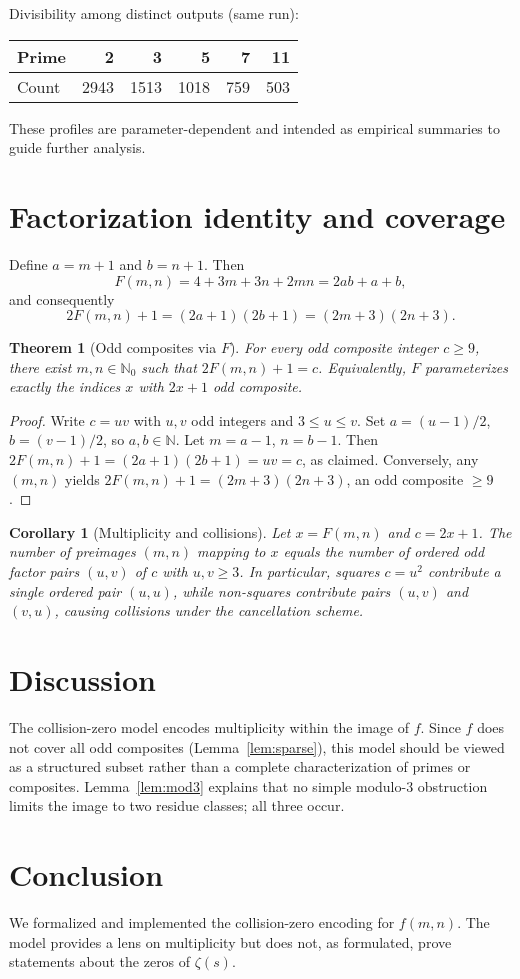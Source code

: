 \documentclass[12pt,a4paper]{article}
\newtheorem{theorem}{Theorem}[section]
\newtheorem{corollary}{Corollary}[section]
\begin{document}
Divisibility among distinct outputs (same run):
\begin{center}
\begin{tabular}{l|rrrrr}
Prime & 2 & 3 & 5 & 7 & 11 \\
\hline
Count & 2943 & 1513 & 1018 & 759 & 503 \\
\end{tabular}
\end{center}

These profiles are parameter-dependent and intended as empirical summaries to guide further analysis.

\section{Factorization identity and coverage}
Define \(a=m+1\) and \(b=n+1\). Then
\[
F(m,n) = 4 + 3m + 3n + 2mn = 2ab + a + b,
\]
and consequently
\[
2F(m,n) + 1 = (2a+1)(2b+1) = (2m+3)(2n+3).
\]

\begin{theorem}[Odd composites via \(F\)]\label{thm:coverage}
For every odd composite integer \(c\ge 9\), there exist \(m,n\in\mathbb{N}_0\) such that \(2F(m,n) + 1 = c\). Equivalently, \(F\) parameterizes exactly the indices \(x\) with \(2x+1\) odd composite.
\end{theorem}
\begin{proof}
Write \(c=uv\) with \(u,v\) odd integers and \(3\le u\le v\). Set \(a=(u-1)/2\), \(b=(v-1)/2\), so \(a,b\in\mathbb{N}\). Let \(m=a-1\), \(n=b-1\). Then
\(2F(m,n) + 1 = (2a+1)(2b+1) = uv = c\), as claimed. Conversely, any \((m,n)\) yields \(2F(m,n)+1=(2m+3)(2n+3)\), an odd composite \(\ge 9\).
\end{proof}

\begin{corollary}[Multiplicity and collisions]\label{cor:mult}
Let \(x=F(m,n)\) and \(c=2x+1\). The number of preimages \((m,n)\) mapping to \(x\) equals the number of ordered odd factor pairs \((u,v)\) of \(c\) with \(u,v\ge 3\). In particular, squares \(c=u^2\) contribute a single ordered pair \((u,u)\), while non-squares contribute pairs \((u,v)\) and \((v,u)\), causing collisions under the cancellation scheme.
\end{corollary}

\section{Discussion}
The collision-zero model encodes multiplicity within the image of \(f\). Since \(f\) does not cover all odd composites (Lemma~\ref{lem:sparse}), this model should be viewed as a structured subset rather than a complete characterization of primes or composites. Lemma~\ref{lem:mod3} explains that no simple modulo-3 obstruction limits the image to two residue classes; all three occur.

\section{Conclusion}
We formalized and implemented the collision-zero encoding for \(f(m,n)\). The model provides a lens on multiplicity but does not, as formulated, prove statements about the zeros of \(\zeta(s)\).
\end{document}
